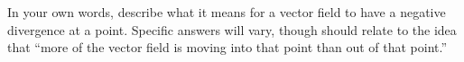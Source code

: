{In your own words, describe what it means for a vector field to have a negative divergence at a point.
}
{Specific answers will vary, though should relate to the idea that ``more of the vector field is moving into that point than out of that point.''
}
